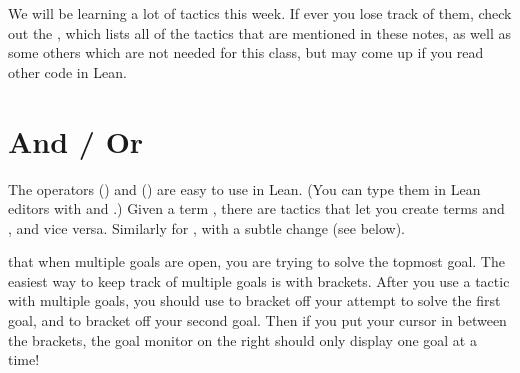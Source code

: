 \documentclass[letterpaper,10pt,english]{sphinxmanual}
\begin{document}
\sphinxAtStartPar
We will be learning a lot of tactics this week.
If ever you lose track of them, check out the {\hyperref[\detokenize{tactics::doc}]{}},
which lists all of the tactics that are mentioned in these notes,
as well as some others which are not needed for this class, but may come up if you read other code in Lean.


\section{And / Or}
\label{\detokenize{day1:and-or}}
\sphinxAtStartPar
The operators  () and  () are easy to use in Lean.
(You can type them in Lean editors with  and .)
Given a term ,
there are tactics that let you
create terms  and , and vice versa.
Similarly for , with a subtle change (see below).

\sphinxAtStartPar
{} that when multiple goals are open, you are trying to solve the topmost goal.
The easiest way to keep track of multiple goals is with brackets.
After you use a tactic with multiple goals, you should use \sphinxcode{\sphinxupquote{\{ \},}} to bracket off your attempt to solve the first goal,
and \sphinxcode{\sphinxupquote{\{ \},}} to bracket off your second goal.
Then if you put your cursor in between the brackets, the goal monitor on the right should only display one goal at a time!
\end{document}
